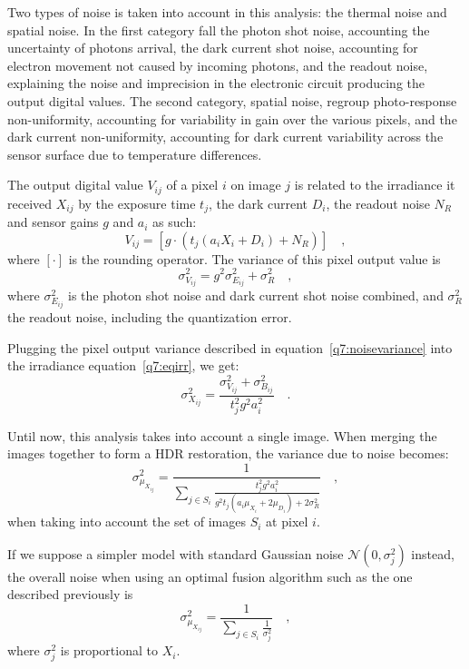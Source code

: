 \documentclass{report}
\begin{document}
Two types of noise is taken into account in this analysis: the thermal noise and spatial noise. In the first category fall the photon shot noise, accounting the uncertainty of photons arrival, the dark current shot noise, accounting for electron movement not caused by incoming photons, and the readout noise, explaining the noise and imprecision in the electronic circuit producing the output digital values. The second category, spatial noise, regroup photo-response non-uniformity, accounting for variability in gain over the various pixels, and the dark current non-uniformity, accounting for dark current variability across the sensor surface due to temperature differences.

The output digital value $V_{ij}$ of a pixel $i$ on image $j$ is related to the irradiance it received $X_{ij}$ by the exposure time $t_j$, the dark current $D_i$, the readout noise $N_R$ and sensor gains $g$ and $a_i$ as such:
\begin{equation}
V_{ij} = \left[ g \cdot \left( t_j \left( a_i X_i + D_i \right ) + N_R\right) \right] \quad,
\end{equation}
where $\left[ \cdot \right]$ is the rounding operator. The variance of this pixel output value is
\begin{equation}
\label{q7:noisevariance}
\sigma_{V_{ij}}^2 = g^2 \sigma_{E_{ij}}^2 + \sigma_R^2
\quad,
\end{equation}
where $\sigma_{E_{ij}}^2$ is the photon shot noise and dark current shot noise combined, and $\sigma_R^2$ the readout noise, including the quantization error.

Plugging the pixel output variance described in equation~\eqref{q7:noisevariance} into the irradiance equation~\eqref{q7:eqirr}, we get:
\begin{equation}
\sigma_{X_{ij}}^2 = \frac{\sigma_{V_{ij}}^2 + \sigma_{B_{ij}}^2}{t_j^2 g^2 a_i^2} \quad.
\end{equation}

Until now, this analysis takes into account a single image. When merging the images together to form a HDR restoration, the variance due to noise becomes:
\begin{equation}
\sigma_{\mu_{X_{ij}}}^2 = \frac{1}{\sum_{j \in S_i} \frac{t_j^2 g^2 a_i^2}{g^2 t_j \left( a_i \mu_{X_i} + 2 \mu_{D_i} \right) + 2 \sigma_R^2}} \quad,
\end{equation}
when taking into account the set of images $S_i$ at pixel $i$.

If we suppose a simpler model with standard Gaussian noise $\mathcal{N}(0,\sigma_j^2)$ instead, the overall noise when using an optimal fusion algorithm such as the one described previously is
\begin{equation}
\sigma_{\mu_{X_{ij}}}^2 = \frac{1}{\sum_{j \in S_i} \frac{1}{\sigma_j^2}}
\quad,
\end{equation}
where $\sigma_j^2$ is proportional to $X_i$.
\end{document}
